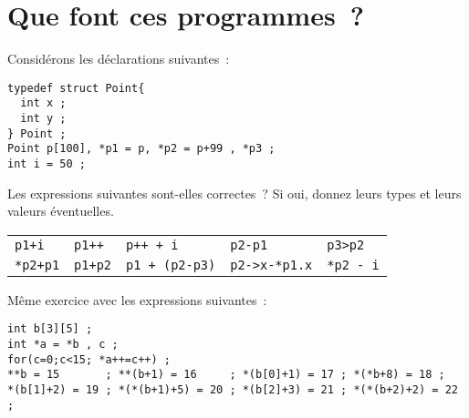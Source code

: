 \section{Que font ces programmes~?}
Consid\'erons les d\'eclarations suivantes~:
\begin{verbatim}
typedef struct Point{
  int x ;
  int y ;
} Point ;
Point p[100], *p1 = p, *p2 = p+99 , *p3 ;
int i = 50 ;
\end{verbatim}
Les expressions suivantes  sont-elles correctes~? Si oui, donnez leurs
types et leurs valeurs \'eventuelles.
\par
\begin{center}
  \begin{tabular}{lllll}
    \verb^p1+i^ & \verb^p1++^ & \verb^p++ + i^ & \verb^p2-p1^ & \verb^p3>p2^ \\
    \verb^*p2+p1^ & \verb^p1+p2^ & \verb^p1 + (p2-p3)^ & \verb^p2->x-*p1.x^ & \verb^*p2 - i^
  \end{tabular}
\end{center}
\par
M\^eme exercice avec les expressions suivantes~:
\begin{verbatim}
int b[3][5] ;
int *a = *b , c ;
for(c=0;c<15; *a++=c++) ;
**b = 15       ; **(b+1) = 16     ; *(b[0]+1) = 17 ; *(*b+8) = 18 ;
*(b[1]+2) = 19 ; *(*(b+1)+5) = 20 ; *(b[2]+3) = 21 ; *(*(b+2)+2) = 22 ;
\end{verbatim}
